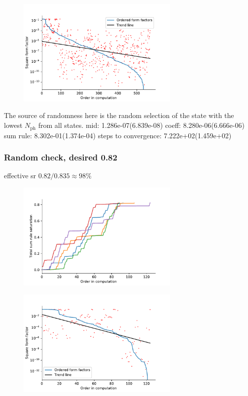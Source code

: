 \documentclass[11pt, a4paper]{report} %
\begin{document}
\begin{figure}[tb!]
  \centering
  \includegraphics[width=0.7\textwidth]{ffsizes_rand_check.pdf}
\end{figure}

The source of randomness here is the random selection of the state with the lowest \(N_{\mathrm{ph}}\) from all states.
mid: 1.286e-07(6.839e-08)
coeff: 8.280e-06(6.666e-06)
sum rule: 8.302e-01(1.374e-04)
steps to convergence: 7.222e+02(1.459e+02)

\subsubsection{Random check, desired 0.82}

effective sr \(0.82/0.835\approx98\%\)

\begin{figure}[tb!]
  \centering
  \includegraphics[width=0.7\textwidth]{saturation_history_rand_check_lower.pdf}
\end{figure}

\begin{figure}[tb!]
  \centering
  \includegraphics[width=0.7\textwidth]{ffsizes_rand_check_lower.pdf}
\end{figure}
\end{document}
